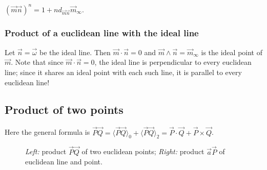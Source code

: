 \documentclass{birkjour}
\newcommand{\mydogblue}{{\color{gray} $\square$~~}}
\begin{document}
\myexercise  $(\vec{m}\vec{n})^{n} = 1 + {n d_{\vec{m}\vec{n}} \vec{m}_{\infty}}$. %

\subsubsection{Product of a euclidean line with the ideal line} Let $\vec{n} =\vec{\omega}$ be the ideal line. Then $\vec{m} \cdot \vec{n} = 0$ and $\vec{m} \wedge \vec{n} = \vec{m}_{\infty}$ is the ideal point of $\vec{m}$.  Note that since $\vec{m} \cdot \vec{n} = 0$, the ideal line is perpendicular to every euclidean line; since it shares an ideal point with each such line, it is  parallel to every euclidean line!

\subsection{Product of two points}
\label{sec:pr2pts}
Here the general formula is $\vec{P} \vec{Q} =  \langle \vec{P}\vec{Q}\rangle_{0} +\langle \vec{P}\vec{Q}\rangle_{2} = \vec{P} \cdot \vec{Q} + \vec{P} \times \vec{Q}$.  

   \begin{figure}
   \centering
{\setlength\fboxsep{0pt}} \hspace{.02\textwidth}
{\setlength\fboxsep{0pt}}\caption{\textit{Left:}  product $\vec{P}\vec{Q}$ of two euclidean points; \textit{Right:}  product $\vec{a}\vec{P}$ of euclidean line and point.}
\label{fig:twoPoints}
\end{figure}
\end{document}
